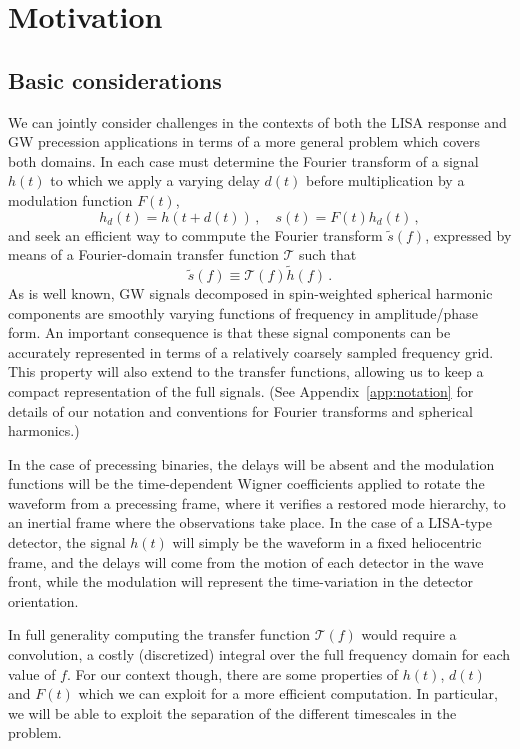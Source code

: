 \documentclass[aps,showpacs,twocolumn,
prd,superscriptaddress,nofootinbib]{revtex4-1}
\newcommand{\be}{\begin{equation}}
\newcommand{\ee}{\end{equation}}
\newcommand\calT{{\mathcal{T}}}
\begin{document}

\section{Motivation}
\label{sec:motivation}


\subsection{Basic considerations}
\label{subsec:basic}

We can jointly consider challenges in the contexts of both the LISA response and GW precession applications in terms of a more general problem which covers both domains. In each case must determine the Fourier transform of a signal $h(t)$ to which we apply a varying delay $d(t)$ before multiplication by a modulation function $F(t)$,
\be
\label{eq:delay-mod-defs}
	h_{d}(t) = h(t+d(t)) \,, \quad s(t) = F(t)h_{d}(t) \,,
\ee
and seek an efficient way to commpute the Fourier transform $\tilde{s}(f)$, expressed by means of a Fourier-domain transfer function $\calT$ such that
\be\label{eq:deftransfer}
	\tilde{s}(f) \equiv \calT(f) \tilde{h}(f) \,. 
\ee
As is well known, GW signals decomposed in spin-weighted spherical harmonic components are smoothly varying functions of frequency in amplitude/phase form. An important consequence is that these signal components can be accurately represented in terms of a relatively coarsely sampled frequency grid. This property will also extend to the transfer functions, allowing us to keep a compact representation of the full signals. (See Appendix~\ref{app:notation} for details of our notation and conventions for Fourier transforms and spherical harmonics.)

In the case of precessing binaries, the delays will be absent and the modulation functions will be the time-dependent Wigner coefficients applied to rotate the waveform from a precessing frame, where it verifies a restored mode hierarchy, to an inertial frame where the observations take place. In the case of a LISA-type detector, the signal $h(t)$ will simply be the waveform in a fixed heliocentric frame, and the delays will come from the motion of each detector in the wave front, while the modulation will represent the time-variation in the detector orientation.

In full generality computing the transfer function $\calT(f)$ would require a convolution, a costly (discretized) integral over the full frequency domain for each value of $f$. For our context though, there are some properties of $h(t)$, $d(t)$ and $F(t)$ which we can exploit for a more efficient computation. In particular, we will be able to exploit the separation of the different timescales in the problem.
\end{document}
